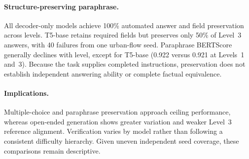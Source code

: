 \documentclass[a4paper,fleqn]{cas-sc}
\begin{document}
\paragraph{Structure-preserving paraphrase.}
All decoder-only models achieve 100\% automated answer and field preservation across levels. T5-base retains required fields but preserves only 50\% of Level~3 answers, with 40 failures from one urban-flow seed. Paraphrase BERTScore generally declines with level, except for T5-base (0.922 versus 0.921 at Levels~1 and~3). Because the task supplies completed instructions, preservation does not establish independent answering ability or complete factual equivalence.

\paragraph{Implications.}
Multiple-choice and paraphrase preservation approach ceiling performance, whereas open-ended generation shows greater variation and weaker Level~3 reference alignment. Verification varies by model rather than following a consistent difficulty hierarchy. Given uneven independent seed coverage, these comparisons remain descriptive.




\end{document}
